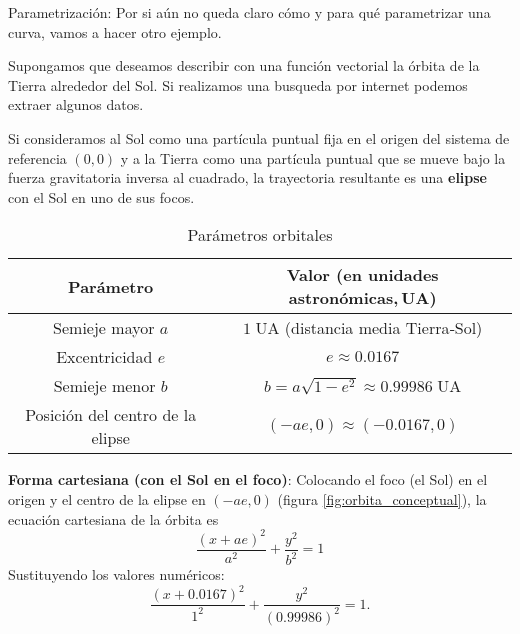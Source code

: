 \begin{example}{Parametrización:}
  Por si aún no queda claro cómo y para qué parametrizar una curva, vamos a hacer otro ejemplo.

  Supongamos que deseamos describir con una función vectorial la órbita de la Tierra alrededor del Sol. Si realizamos una busqueda por internet podemos extraer algunos datos.

  Si consideramos al Sol como una partícula puntual fija en el origen del sistema de referencia $(0,0)$ y a la Tierra como una partícula puntual que se mueve bajo la fuerza gravitatoria inversa al cuadrado, la trayectoria resultante es una \textbf{elipse} con el Sol en uno de sus focos.
  \begin{table}[ht]
    \begin{tabular}{c|c}
      Parámetro & Valor (en unidades astronómicas, UA) \\
      \hline
      Semieje mayor $a$ & $1\;\text{UA}$ (distancia media Tierra‑Sol) \\
      Excentricidad $e$ & $\displaystyle e \approx 0.0167$ \\
      Semieje menor $b$ & $\displaystyle b = a\sqrt{1-e^{2}} \approx 0.99986\;\text{UA}$ \\
      Posición del centro de la elipse & $(-ae,0) \approx (-0.0167,0)$ 
    \end{tabular}
    \caption{Parámetros orbitales}
  \end{table}

  \textbf{Forma cartesiana (con el Sol en el foco)}: Colocando el foco (el Sol) en el origen y el centro de la elipse en $(-ae,0)$ (figura \ref{fig:orbita_conceptual}), la ecuación cartesiana de la órbita es 
  $$
  \boxed{\frac{(x+ae)^{2}}{a^{2}}+\frac{y^{2}}{b^{2}}=1}
  $$
  Sustituyendo los valores numéricos:
  $$
  \frac{(x+0.0167)^{2}}{1^{2}}+\frac{y^{2}}{(0.99986)^{2}}=1 .
  $$
  \begin{figure}[ht]
    \centering
\end{figure}
\end{example}
